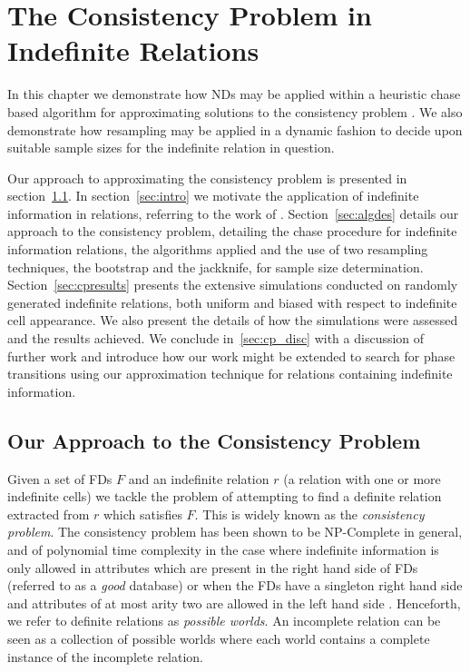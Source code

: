 \chapter{The Consistency Problem in Indefinite Relations}\label{chap:consistency}

In this chapter we demonstrate how NDs may be applied within a
heuristic chase based algorithm for approximating solutions to the
consistency problem \cite{vn95}. We also demonstrate how resampling
may be applied in a dynamic fashion to decide upon suitable sample
sizes for the indefinite relation in question.

\medskip

Our approach to approximating the consistency problem is presented in
section~\ref{sec:conprob}. In section~\ref{sec:intro} we motivate the
application of indefinite 
information in relations, referring to the work of
\cite{vn95,inv91,ivv95}.   Section~\ref{sec:algdes} details our
approach to the consistency problem, detailing the chase procedure for
indefinite information relations, the algorithms applied and the use
of two resampling techniques, the bootstrap and the jackknife, for
sample size determination. Section~\ref{sec:cpresults} presents the
extensive simulations conducted on randomly generated indefinite
relations, both uniform and biased with respect to indefinite cell
appearance. We also present the details of how the simulations were
assessed and the results achieved. We conclude in~\ref{sec:cp_disc}
with a discussion of further work and introduce how our work might be
extended to search for phase transitions using our approximation
technique for relations containing indefinite information.


\section{Our Approach to the Consistency Problem}\label{sec:conprob}


Given a set of FDs $F$ and an indefinite relation $r$ (a relation with one or
more indefinite cells) we tackle the problem of attempting
to find a definite relation extracted from $r$ which satisfies $F$.
This is widely known as the {\em consistency problem}.  
The consistency
problem has been shown to be NP-Complete in general, and of 
polynomial time complexity in the case where indefinite information is
only allowed in attributes which are present in the right hand side of
FDs (referred to as a {\em good} database) or when the FDs have a singleton right hand side and attributes of
at most arity two are allowed in the left hand side \cite{vn95}. 
 Henceforth, we refer to definite relations as {\em possible worlds}.
An incomplete relation can be seen as a collection of possible worlds
where each world contains a complete instance of the incomplete
relation. 

